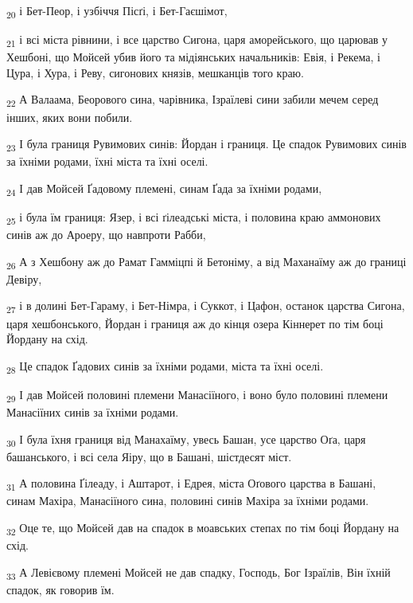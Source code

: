 \begin{tcolorbox}
\textsubscript{20} і Бет-Пеор, і узбіччя Пісґі, і Бет-Гаєшімот,
\end{tcolorbox}
\begin{tcolorbox}
\textsubscript{21} і всі міста рівнини, і все царство Сигона, царя аморейського, що царював у Хешбоні, що Мойсей убив його та мідіянських начальників: Евія, і Рекема, і Цура, і Хура, і Реву, сигонових князів, мешканців того краю.
\end{tcolorbox}
\begin{tcolorbox}
\textsubscript{22} А Валаама, Беорового сина, чарівника, Ізраїлеві сини забили мечем серед інших, яких вони побили.
\end{tcolorbox}
\begin{tcolorbox}
\textsubscript{23} І була границя Рувимових синів: Йордан і границя. Це спадок Рувимових синів за їхніми родами, їхні міста та їхні оселі.
\end{tcolorbox}
\begin{tcolorbox}
\textsubscript{24} І дав Мойсей Ґадовому племені, синам Ґада за їхніми родами,
\end{tcolorbox}
\begin{tcolorbox}
\textsubscript{25} і була їм границя: Язер, і всі ґілеадські міста, і половина краю аммонових синів аж до Ароеру, що навпроти Рабби,
\end{tcolorbox}
\begin{tcolorbox}
\textsubscript{26} А з Хешбону аж до Рамат Гамміцпі й Бетоніму, а від Маханаїму аж до границі Девіру,
\end{tcolorbox}
\begin{tcolorbox}
\textsubscript{27} і в долині Бет-Гараму, і Бет-Німра, і Суккот, і Цафон, останок царства Сигона, царя хешбонського, Йордан і границя аж до кінця озера Кіннерет по тім боці Йордану на схід.
\end{tcolorbox}
\begin{tcolorbox}
\textsubscript{28} Це спадок Ґадових синів за їхніми родами, міста та їхні оселі.
\end{tcolorbox}
\begin{tcolorbox}
\textsubscript{29} І дав Мойсей половині племени Манасіїного, і воно було половині племени Манасіїних синів за їхніми родами.
\end{tcolorbox}
\begin{tcolorbox}
\textsubscript{30} І була їхня границя від Манахаїму, увесь Башан, усе царство Оґа, царя башанського, і всі села Яіру, що в Башані, шістдесят міст.
\end{tcolorbox}
\begin{tcolorbox}
\textsubscript{31} А половина Ґілеаду, і Аштарот, і Едрея, міста Оґового царства в Башані, синам Махіра, Манасіїного сина, половині синів Махіра за їхніми родами.
\end{tcolorbox}
\begin{tcolorbox}
\textsubscript{32} Оце те, що Мойсей дав на спадок в моавських степах по тім боці Йордану на схід.
\end{tcolorbox}
\begin{tcolorbox}
\textsubscript{33} А Левієвому племені Мойсей не дав спадку, Господь, Бог Ізраїлів, Він їхній спадок, як говорив їм.
\end{tcolorbox}

